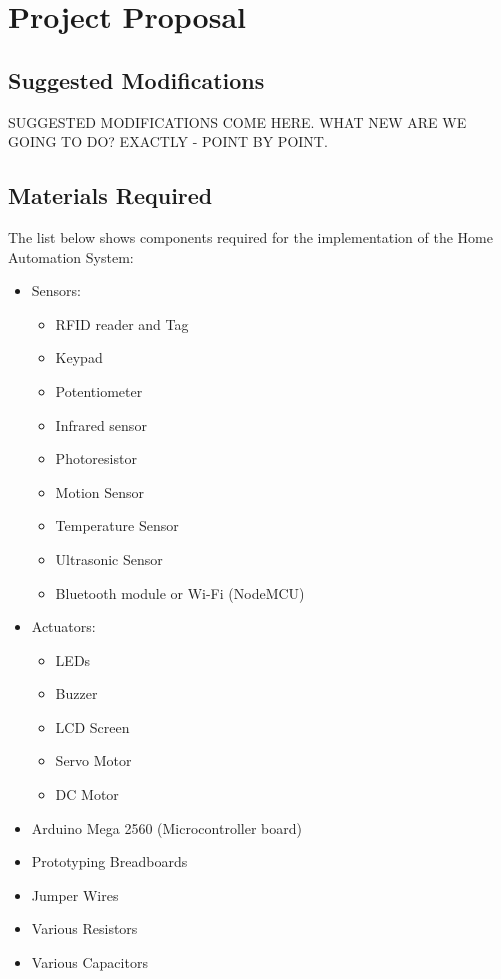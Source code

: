 \documentclass[journal]{IEEEtran}
\begin{document}
\section{Project Proposal}

\subsection{Suggested Modifications}
SUGGESTED MODIFICATIONS COME HERE. WHAT NEW ARE WE GOING TO DO? EXACTLY - POINT BY POINT.

\subsection{Materials Required}
The list below shows components required for the implementation of the Home Automation System:
\begin{itemize}
	\item{Sensors:}
	\begin{itemize}
		\item{RFID reader and Tag}
		\item{Keypad}
		\item{Potentiometer}
		\item{Infrared sensor}
		\item{Photoresistor}
		\item{Motion Sensor}
		\item{Temperature Sensor}
		\item{Ultrasonic Sensor}
		\item{Bluetooth module or Wi-Fi (NodeMCU)}
	\end{itemize}
	\item{Actuators:}
	\begin{itemize}
		\item{LEDs}
		\item{Buzzer}
		\item{LCD Screen}
		\item{Servo Motor}
		\item{DC Motor}
	\end{itemize}
	\item{Arduino Mega 2560 (Microcontroller board)}
	\item{Prototyping Breadboards}
	\item{Jumper Wires}
	\item{Various Resistors}
	\item{Various Capacitors}
\end{itemize}
\end{document}
